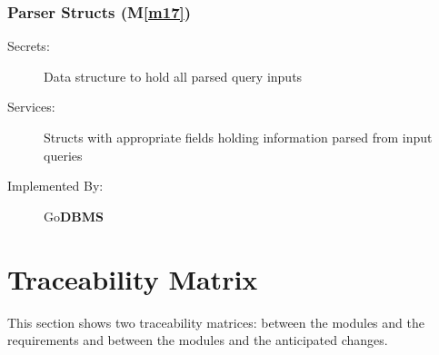 \documentclass[12pt, titlepage]{article}
\newcommand{\mref}[1]{M\ref{#1}}
\begin{document}
\subsubsection{\textbf{Parser Structs} (\mref{m17})}
\begin{description}
\item[Secrets:] {\color{red} Data structure to hold all parsed query inputs}
\item[Services:] {\color{red} Structs with appropriate fields holding information parsed from input queries}
\item[Implemented By:] {\color{red}Go\textbf{DBMS}}
\end{description}

\section{Traceability Matrix} \label{SecTM}

This section shows two traceability matrices: between the modules and the
requirements and between the modules and the anticipated changes.
\end{document}
